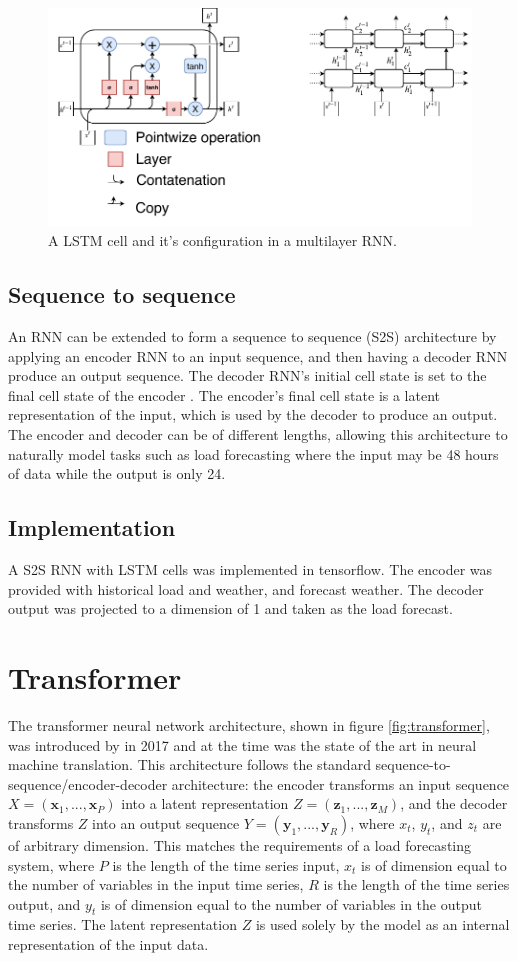 \begin{figure}[htbp]
	\centerline{\includegraphics[trim=0 0cm 0 0, width=.65\textwidth]{images/LSTM.pdf}}
	\caption{A LSTM cell and it's configuration in a multilayer RNN.}
	\label{fig:LSTM}
\end{figure}

\subsection{Sequence to sequence}
An RNN can be extended to form a sequence to sequence (S2S) architecture by applying an encoder RNN to an input sequence, and then having a decoder RNN produce an output sequence.
The decoder RNN's initial cell state is set to the final cell state of the encoder \cite{Cho2014a}.
The encoder's final cell state is a latent representation of the input, which is used by the decoder to produce an output.
The encoder and decoder can be of different lengths, allowing this architecture to naturally model tasks such as load forecasting where the input may be 48 hours of data while the output is only 24.

\subsection{Implementation}
A S2S RNN with LSTM cells was implemented in tensorflow.
The encoder was provided with historical load and weather, and forecast weather.
The decoder output was projected to a dimension of 1 and taken as the load forecast.

\section{Transformer}
The transformer neural network architecture, shown in figure \ref{fig:transformer}, was introduced by \cite{Vaswani2017} in 2017 and at the time was the state of the art in neural machine translation.
This architecture follows the standard sequence-to-sequence/encoder-decoder architecture: the encoder transforms an input sequence $X = (\boldsymbol{x}_1, ..., \boldsymbol{x}_P)$ into a latent representation $Z = (\boldsymbol{z}_1, ..., \boldsymbol{z}_M)$, and the decoder transforms $Z$ into an output sequence $Y = (\boldsymbol{y}_1, ..., \boldsymbol{y}_R)$, where $x_t$, $y_t$, and $z_t$ are of arbitrary dimension.
This matches the requirements of a load forecasting system, where $P$ is the length of the time series input, $x_t$ is of dimension equal to the number of variables in the input time series, $R$ is the length of the time series output, and $y_t$ is of dimension equal to the number of variables in the output time series.
The latent representation $Z$ is used solely by the model as an internal representation of the input data.

